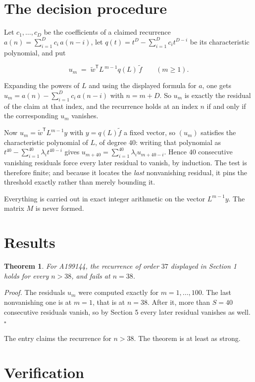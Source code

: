 \documentclass[11pt]{article}
\newtheorem{theorem}{Theorem}
\theoremstyle{definition}
\begin{document}
\section{The decision procedure}

Let $c_1,\dots,c_D$ be the coefficients of a claimed recurrence $a(n) = \sum_{i=1}^{D} c_i\,a(n-i)$, let $q(t) = t^{D} - \sum_{i=1}^{D} c_i t^{D-i}$ be its characteristic polynomial, and put

\[u_m \;=\; \tilde w^{\mathsf T} L^{\,m-1} q(L)\,\tilde f \qquad (m \ge 1).\]

Expanding the powers of $L$ and using the displayed formula for $a$, one gets $u_m = a(n) - \sum_{i=1}^{D} c_i\,a(n-i)$ with $n = m + D$. So $u_m$ is exactly the residual of the claim at that index, and the recurrence holds at an index $n$ if and only if the corresponding $u_m$ vanishes.

Now $u_m = \tilde w^{\mathsf T} L^{m-1} y$ with $y = q(L)\tilde f$ a fixed vector, so $(u_m)$ satisfies the characteristic polynomial of $L$, of degree $40$: writing that polynomial as $t^{40} - \sum_{i=1}^{40} \lambda_i t^{40-i}$ gives $u_{m+40} = \sum_{i=1}^{40} \lambda_i u_{m+40-i}$. Hence $40$ consecutive vanishing residuals force every later residual to vanish, by induction. The test is therefore finite; and because it locates the {\itshape last} nonvanishing residual, it pins the threshold exactly rather than merely bounding it.

Everything is carried out in exact integer arithmetic on the vector $L^{m-1}y$. The matrix $M$ is never formed.

\section{Results}

\begin{theorem} For A199144, the recurrence of order $37$ displayed in Section 1 holds for every $n > 38$, and fails at $n = 38$.\end{theorem}

{\itshape Proof.} The residuals $u_m$ were computed exactly for $m = 1,\dots,100$. The last nonvanishing one is at $m = 1$, that is at $n = 38$. After it, more than $S = 40$ consecutive residuals vanish, so by Section 5 every later residual vanishes as well. $\square$

The entry claims the recurrence for $n > 38$. The theorem is at least as strong.

\section{Verification}
\end{document}
